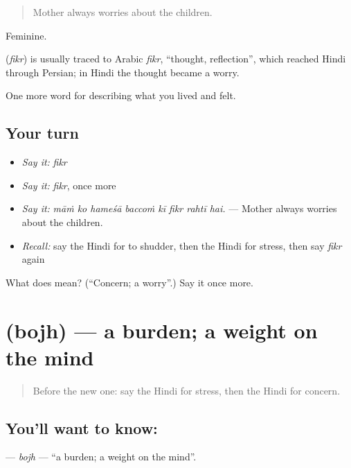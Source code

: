 \begin{quote}
Mother always worries about the children.
\end{quote}

Feminine.

\begin{cousinweb}
\textbf{} (\emph{fikr}) is usually traced to Arabic \emph{fikr}, \textquotedblleft{}thought, reflection\textquotedblright{}, which reached Hindi through Persian; in Hindi the thought became a worry.
\end{cousinweb}

\begin{grammarlens}[title={What you've built}]
One more word for describing what you lived and felt.
\end{grammarlens}

\subsection*{Your turn}
\begin{itemize}
\raggedright
  \item \emph{Say it:} \emph{fikr}
  \item \emph{Say it:} \emph{fikr}, once more
  \item \emph{Say it:} \emph{māṁ ko hameśā baccoṁ kī fikr rahtī hai.} — Mother always worries about the children.
  \item \emph{Recall:} say the Hindi for to shudder, then the Hindi for stress, then say \emph{fikr} again
\end{itemize}

\begin{tcolorbox}[breakable,colback=teal!4,colframe=teal!35!black,title={Before you move on}]
What does  mean? (\textquotedblleft{}Concern; a worry\textquotedblright{}.) Say it once more.
\end{tcolorbox}
\section[\texorpdfstring{\hi{बोझ} (bojh)}{बोझ (bojh)}]{ (bojh) — a burden; a weight on the mind}

\label{lesson:HI-C458-bojh}



\begin{quote}
Before the new one: say the Hindi for stress, then the Hindi for concern.
\end{quote}

\subsection*{You'll want to know: }
\textbf{} — \emph{bojh} — \textquotedblleft{}a burden; a weight on the mind\textquotedblright{}.

